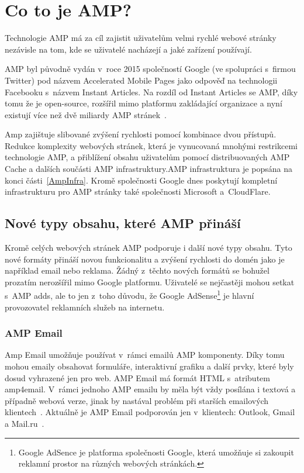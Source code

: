 \chapter{Co to je AMP?}
\label{AMP}
Technologie AMP má za cíl zajistit uživatelům velmi rychlé webové stránky nezávisle na tom, kde se
uživatelé nacházejí a jaké zařízení používají.

AMP byl původně vydán v~roce 2015 společností Google (ve spolupráci s~firmou Twitter) pod názvem Accelerated Mobile Pages jako odpověď
na technologii Facebooku s~názvem Instant Articles. Na rozdíl od Instant Articles se AMP, díky tomu že je
open-source, rozšířil mimo platformu zakládající organizace a nyní existují více než dvě miliardy AMP
stránek~\cite{AMPTurbo}.

Amp zajištuje slibované zvýšení rychlosti pomocí kombinace dvou přístupů. Redukce komplexity webových stránek, která je vynucovaná mnohými restrikcemi technologie AMP, a přiblížení obsahu uživatelům pomocí distribuovaných AMP Cache a dalších součásti AMP infrastruktury.AMP infrastruktura je popsána na konci části~\ref{AmpInfra}. Kromě společnosti Google dnes poskytují kompletní infrastrukturu pro AMP stránky také
společnosti Microsoft a~CloudFlare.

\section{Nové typy obsahu, které AMP přináší}
Kromě celých webových stránek AMP podporuje i další nové typy obsahu. Tyto nové formáty přináší novou funkcionalitu a zvýšení rychlosti do domén jako je například email nebo reklama. Žádný z~těchto nových formátů se bohužel prozatím nerozšířil mimo Google platformu. Uživatelé se nejčastěji mohou setkat s~AMP adds, ale to jen z~toho důvodu, že Google AdSense\footnote{Google AdSence je platforma společnosti Google, která umožňuje si zakoupit reklamní prostor na různých webových stránkách.} je hlavní provozovatel reklamních služeb na internetu.
\subsection*{AMP Email}
Amp Email umožňuje používat v~rámci emailů AMP komponenty. Díky tomu mohou emaily obsahovat formuláře, interaktivní grafiku a další prvky, které byly dosud vyhrazené jen pro web. AMP Email má formát HTML s~atributem amp4email. V~rámci jednoho AMP emailu by měla být vždy posílána i textová a případně webová verze, jinak by nastával problém při starších emailových klientech~\cite[Ch.\ 6, p.\ 285]{VzhuruDoAMP}.
Aktuálně je AMP Email podporován jen v~klientech:
Outlook, Gmail a Mail.ru~\cite{EmailSupport}.

